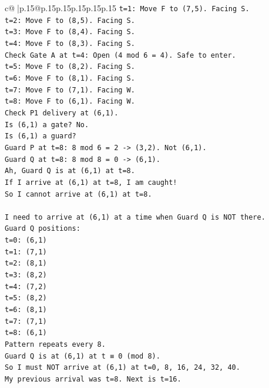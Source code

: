 \documentclass{article}
\begin{document}
{\begin{supertabular}{c@{$\;$}|p{.15\linewidth}@{}p{.15\linewidth}p{.15\linewidth}p{.15\linewidth}p{.15\linewidth}p{.15\linewidth}}
{{{\texttt{t=1: Move F to (7,5). Facing S.} \\
\texttt{t=2: Move F to (8,5). Facing S.} \\
\texttt{t=3: Move F to (8,4). Facing S.} \\
\texttt{t=4: Move F to (8,3). Facing S.} \\
\texttt{Check Gate A at t=4: Open (4 mod 6 = 4). Safe to enter.} \\
\texttt{t=5: Move F to (8,2). Facing S.} \\
\texttt{t=6: Move F to (8,1). Facing S.} \\
\texttt{t=7: Move F to (7,1). Facing W.} \\
\texttt{t=8: Move F to (6,1). Facing W.} \\
\texttt{Check P1 delivery at (6,1).} \\
\texttt{Is (6,1) a gate? No.} \\
\texttt{Is (6,1) a guard?} \\
\texttt{Guard P at t=8: 8 mod 6 = 2 {-}> (3,2). Not (6,1).} \\
\texttt{Guard Q at t=8: 8 mod 8 = 0 {-}> (6,1).} \\
\texttt{Ah, Guard Q is at (6,1) at t=8.} \\
\texttt{If I arrive at (6,1) at t=8, I am caught!} \\
\texttt{So I cannot arrive at (6,1) at t=8.} \\
\\ 
\texttt{I need to arrive at (6,1) at a time when Guard Q is NOT there.} \\
\texttt{Guard Q positions:} \\
\texttt{t=0: (6,1)} \\
\texttt{t=1: (7,1)} \\
\texttt{t=2: (8,1)} \\
\texttt{t=3: (8,2)} \\
\texttt{t=4: (7,2)} \\
\texttt{t=5: (8,2)} \\
\texttt{t=6: (8,1)} \\
\texttt{t=7: (7,1)} \\
\texttt{t=8: (6,1)} \\
\texttt{Pattern repeats every 8.} \\
\texttt{Guard Q is at (6,1) at t ≡ 0 (mod 8).} \\
\texttt{So I must NOT arrive at (6,1) at t=0, 8, 16, 24, 32, 40.} \\
\texttt{My previous arrival was t=8. Next is t=16.} \\
}}}
\end{supertabular}}
\end{document}
